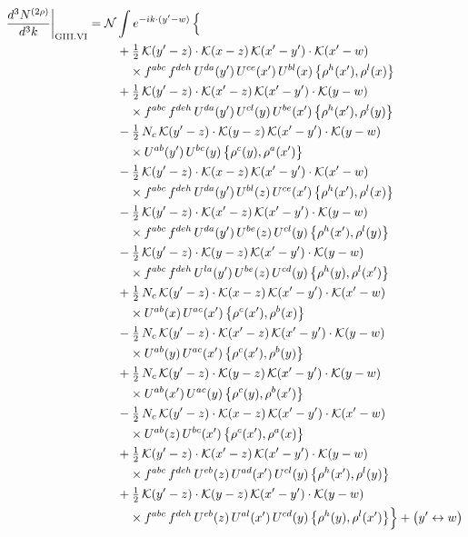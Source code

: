 \documentclass[10pt]{article}
\numberwithin{equation}{section}
\newcommand{\KK}{\mathcal K}
\newcommand{\NN}{\mathcal N}
\begin{document}
\begin{align}
\frac{d^3N^{(2\rho)}}{d^3k}\bigg|_{\rm GIII.VI}={}&\NN\int e^{-ik\cdot(y'-w)}\,\Big\{\notag\\
&\quad +\tfrac12\,\KK(y'-z)\cdot\KK(x-z)\,\KK(x'-y')\cdot\KK(x'-w)\notag\\
&\qquad\times f^{abc}\,f^{deh}\,U^{da}(y')\,U^{ce}(x')\,U^{bl}(x)\,\big\{\rho^{h}(x'),\rho^{l}(x)\big\}\notag\\
&\quad +\tfrac12\,\KK(y'-z)\cdot\KK(x'-z)\,\KK(x'-y')\cdot\KK(y-w)\notag\\
&\qquad\times f^{abc}\,f^{deh}\,U^{da}(y')\,U^{cl}(y)\,U^{be}(x')\,\big\{\rho^{h}(x'),\rho^{l}(y)\big\}\notag\\
&\quad -\tfrac12\,N_{c}\,\KK(y'-z)\cdot\KK(y-z)\,\KK(x'-y')\cdot\KK(y-w)\notag\\
&\qquad\times U^{ab}(y')\,U^{bc}(y)\,\big\{\rho^{c}(y),\rho^{a}(x')\big\}\notag\\
&\quad -\tfrac12\,\KK(y'-z)\cdot\KK(x-z)\,\KK(x'-y')\cdot\KK(x'-w)\notag\\
&\qquad\times f^{abc}\,f^{deh}\,U^{da}(y')\,U^{bl}(z)\,U^{ce}(x')\,\big\{\rho^{h}(x'),\rho^{l}(x)\big\}\notag\\
&\quad -\tfrac12\,\KK(y'-z)\cdot\KK(x'-z)\,\KK(x'-y')\cdot\KK(y-w)\notag\\
&\qquad\times f^{abc}\,f^{deh}\,U^{da}(y')\,U^{be}(z)\,U^{cl}(y)\,\big\{\rho^{h}(x'),\rho^{l}(y)\big\}\notag\\
&\quad -\tfrac12\,\KK(y'-z)\cdot\KK(y-z)\,\KK(x'-y')\cdot\KK(y-w)\notag\\
&\qquad\times f^{abc}\,f^{deh}\,U^{la}(y')\,U^{be}(z)\,U^{cd}(y)\,\big\{\rho^{h}(y),\rho^{l}(x')\big\}\notag\\
&\quad +\tfrac12\,N_{c}\,\KK(y'-z)\cdot\KK(x-z)\,\KK(x'-y')\cdot\KK(x'-w)\notag\\
&\qquad\times U^{ab}(x)\,U^{ac}(x')\,\big\{\rho^{c}(x'),\rho^{b}(x)\big\}\notag\\
&\quad -\tfrac12\,N_{c}\,\KK(y'-z)\cdot\KK(x'-z)\,\KK(x'-y')\cdot\KK(y-w)\notag\\
&\qquad\times U^{ab}(y)\,U^{ac}(x')\,\big\{\rho^{c}(x'),\rho^{b}(y)\big\}\notag\\
&\quad +\tfrac12\,N_{c}\,\KK(y'-z)\cdot\KK(y-z)\,\KK(x'-y')\cdot\KK(y-w)\notag\\
&\qquad\times U^{ab}(x')\,U^{ac}(y)\,\big\{\rho^{c}(y),\rho^{b}(x')\big\}\notag\\
&\quad -\tfrac12\,N_{c}\,\KK(y'-z)\cdot\KK(x-z)\,\KK(x'-y')\cdot\KK(x'-w)\notag\\
&\qquad\times U^{ab}(z)\,U^{bc}(x')\,\big\{\rho^{c}(x'),\rho^{a}(x)\big\}\notag\\
&\quad +\tfrac12\,\KK(y'-z)\cdot\KK(x'-z)\,\KK(x'-y')\cdot\KK(y-w)\notag\\
&\qquad\times f^{abc}\,f^{deh}\,U^{eb}(z)\,U^{ad}(x')\,U^{cl}(y)\,\big\{\rho^{h}(x'),\rho^{l}(y)\big\}\notag\\
&\quad +\tfrac12\,\KK(y'-z)\cdot\KK(y-z)\,\KK(x'-y')\cdot\KK(y-w)\notag\\
&\qquad\times f^{abc}\,f^{deh}\,U^{eb}(z)\,U^{al}(x')\,U^{cd}(y)\,\big\{\rho^{h}(y),\rho^{l}(x')\big\}\Big\}+\big(y'\leftrightarrow w\big)\label{eq:sum-GIII.VI}
\end{align}
\end{document}
